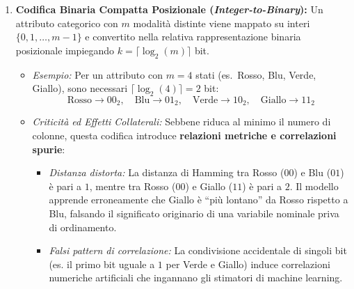 \begin{enumerate}
    \item \textbf{Codifica Binaria Compatta Posizionale (\textit{Integer-to-Binary}):}
    Un attributo categorico con $m$ modalità distinte viene mappato su interi $\{0, 1, \dots, m-1\}$ e convertito nella relativa rappresentazione binaria posizionale impiegando $k = \lceil \log_2(m) \rceil$ bit.
    \begin{itemize}
        \item \textit{Esempio:} Per un attributo con $m=4$ stati (es.~Rosso, Blu, Verde, Giallo), sono necessari $\lceil \log_2(4) \rceil = 2$ bit:
        \begin{equation}
        \text{Rosso} \to 00_2, \quad \text{Blu} \to 01_2, \quad \text{Verde} \to 10_2, \quad \text{Giallo} \to 11_2
        \end{equation}
        \item \textit{Criticità ed Effetti Collaterali:} Sebbene riduca al minimo il numero di colonne, questa codifica introduce \textbf{relazioni metriche e correlazioni spurie}:
        \begin{itemize}
            \item \textit{Distanza distorta:} La distanza di Hamming tra Rosso ($00$) e Blu ($01$) è pari a $1$, mentre tra Rosso ($00$) e Giallo ($11$) è pari a $2$. Il modello apprende erroneamente che Giallo è ``più lontano'' da Rosso rispetto a Blu, falsando il significato originario di una variabile nominale priva di ordinamento.
            \item \textit{Falsi pattern di correlazione:} La condivisione accidentale di singoli bit (es. il primo bit uguale a $1$ per Verde e Giallo) induce correlazioni numeriche artificiali che ingannano gli stimatori di machine learning.
        \end{itemize}
    \end{itemize}


\end{enumerate}
